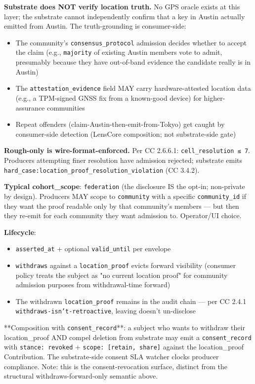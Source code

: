 \documentclass[11pt]{article}
\begin{document}
\textbf{Substrate does NOT verify location truth.} No GPS oracle exists at this layer; the substrate cannot independently confirm that a key in Austin actually emitted from Austin. The truth-grounding is consumer-side:


\begin{itemize}\setlength\itemsep{0pt}
\item The community's \texttt{consensus\_protocol} admission decides whether to accept the claim (e.g., \texttt{majority} of existing Austin members vote to admit, presumably because they have out-of-band evidence the candidate really is in Austin)
\item The \texttt{attestation\_evidence} field MAY carry hardware-attested location data (e.g., a TPM-signed GNSS fix from a known-good device) for higher-assurance communities
\item Repeat offenders (claim-Austin-then-emit-from-Tokyo) get caught by consumer-side detection (LensCore composition; not substrate-side gate)
\end{itemize}


\textbf{Rough-only is wire-format-enforced.} Per CC 2.6.6.1: \texttt{cell\_resolution ≤ 7}. Producers attempting finer resolution have admission rejected; substrate emits \texttt{hard\_case:location\_proof\_resolution\_violation} (CC 3.4.2).


\textbf{Typical cohort\_scope}: \texttt{federation} (the disclosure IS the opt-in; non-private by design). Producers MAY scope to \texttt{community} with a specific \texttt{community\_id} if they want the proof readable only by that community's members — but then they re-emit for each community they want admission to. Operator/UI choice.


\textbf{Lifecycle}:


\begin{itemize}\setlength\itemsep{0pt}
\item \texttt{asserted\_at} + optional \texttt{valid\_until} per envelope
\item \texttt{withdraws} against a \texttt{location\_proof} evicts forward visibility (consumer policy treats the subject as "no current location proof" for community admission purposes from withdrawal-time forward)
\item The withdrawn \texttt{location\_proof} remains in the audit chain — per CC 2.4.1 \texttt{withdraws-isn't-retroactive}, leaving doesn't un-disclose
\end{itemize}


**Composition with \texttt{consent\_record}**: a subject who wants to withdraw their location\_proof AND compel deletion from substrate may emit a \texttt{consent\_record} with \texttt{stance: revoked} + \texttt{scope: [retain, share]} against the location\_proof Contribution. The substrate-side consent SLA watcher clocks producer compliance. Note: this is the consent-revocation surface, distinct from the structural withdraws-forward-only semantic above.
\end{document}
